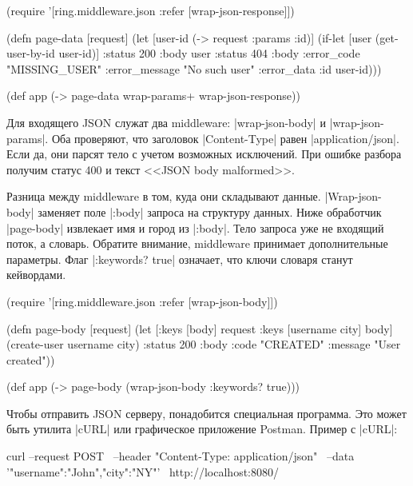 \begin{english}
  \begin{clojure}
(require '[ring.middleware.json
           :refer [wrap-json-response]])

(defn page-data [request]
  (let [user-id (-> request :params :id)]
    (if-let [user (get-user-by-id user-id)]
      {:status 200 :body user}
      {:status 404
       :body {:error_code "MISSING_USER"
              :error_message "No such user"
              :error_data {:id user-id}}})))

(def app (-> page-data
             wrap-params+
             wrap-json-response))
  \end{clojure}
\end{english}

Для входящего JSON служат два middleware: \spverb|wrap-json-body| и
\spverb|wrap-json-params|. Оба проверяют, что заголовок \spverb|Content-Type|
равен \spverb|application/json|. Если да, они парсят тело с учетом возможных
исключений. При ошибке разбора получим статус 400 и текст <<JSON body
malformed>>.

Разница между middleware в том, куда они складывают
данные. \spverb|Wrap-json-body| заменяет поле \spverb|:body| запроса на
структуру данных. Ниже обработчик \spverb|page-body| извлекает имя и город из
\spverb|:body|. Тело запроса уже не входящий поток, а словарь. Обратите
внимание, middleware принимает дополнительные параметры. Флаг \spverb|:keywords? true|
означает, что ключи словаря станут кейвордами.

\begin{english}
  \begin{clojure}
(require '[ring.middleware.json :refer [wrap-json-body]])

(defn page-body [request]
  (let [{:keys [body]} request
        {:keys [username city]} body]
    (create-user username city)
    {:status 200
     :body {:code "CREATED"
            :message "User created"}}))

(def app (-> page-body
             (wrap-json-body {:keywords? true})))
  \end{clojure}
\end{english}

Чтобы отправить JSON серверу, понадобится специальная программа. Это может быть
утилита \spverb|cURL| или графическое приложение Postman. Пример с
\spverb|cURL|:

\begin{english}
  \begin{bash}
curl --request POST \
     --header "Content-Type: application/json" \
     --data '{"username":"John","city":"NY"}' \
     http://localhost:8080/
  \end{bash}
\end{english}

